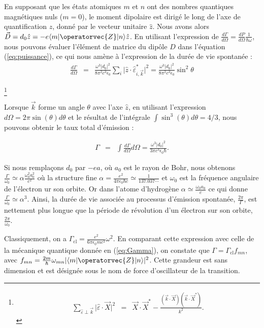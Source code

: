 En supposant que les états atomiques $m$ et $n$ ont des nombres quantiques magnétiques nuls ($m=0$), le moment dipolaire est dirigé le long de l'axe de quantification $z$, donné par le vecteur unitaire $\hat{z}$. Nous avons alors $\vec{D} = d_0\hat{z} = -e\langle m | \operatorvec{Z} | n \rangle \hat{z}$. En utilisant l'expression de $\frac{d\Gamma}{d\Omega} = \frac{dP}{d\Omega}\frac{1}{\hbar \omega }$, nous pouvons évaluer l'élément de matrice du dipôle $D$ dans l'équation (\ref{eq:puissance}), ce qui nous amène à l'expression de la durée de vie spontanée :
\begin{eqnarray}
	\frac{ d \Gamma}{d \Omega} & = & \frac{\omega^3 \vert d_0 \vert ^2}{8 \pi^2 c^3 \epsilon_0} \sum_i \vert \hat{z} \cdot \hat{\varepsilon}_{i , \vec{k}}^\ast \vert^2  = \frac{\omega^3 \vert d_0 \vert ^2}{8 \pi^2 c^3 \epsilon_0} \sin^2 \theta 
\end{eqnarray}

\footnote{
\begin{eqnarray}
	\sum_{\hat{\varepsilon} \perp \vec{k}} \vert \hat{\varepsilon} \cdot \vec{X} \vert^2 & = & \vec{X} \cdot \vec{X}^\ast - \frac{(\vec{k} \cdot \vec{X})(\vec{k} \cdot \vec{X}^\ast)}{k^2}.
\end{eqnarray}
}

Lorsque $\vec{k}$ forme un angle $\theta$ avec l'axe $\hat{z}$, en utilisant l'expression $d\Omega = 2\pi\sin(\theta)d\theta$ et le résultat de l'intégrale $\int  \sin^3(\theta)d\theta = 4/3$, nous pouvons obtenir le taux total d'émission :

\begin{eqnarray}
	\Gamma  & =  & \int \frac{d\Gamma}{d \Omega}  d \Omega =  \frac{\omega^3 |d_0|^2}{3\pi c^3 \epsilon_0 \hbar}. \label{eq:Gamma}	
\end{eqnarray}


Si nous remplaçons $d_0$ par $-ea$, où $a_0$ est le rayon de Bohr, nous obtenons $\frac{\Gamma}{\omega_0 } \simeq \alpha \frac{ \omega_0^2 a_0^2}{c^2}$ où la structure fine $\alpha = \frac{e^2}{4 \pi \epsilon_0 \hbar c} \simeq \frac{1}{137.037\cdots}$ et $\omega_0$ est la fréquence angulaire de l'électron ur son orbite. Or dans l'atome d'hydrogène $\alpha \simeq \frac{\omega_0 a_0}{c}$ ce qui donne $\frac{\Gamma}{\omega_0} \simeq \alpha^3$. Ainsi, la durée de vie associée au processus d'émission spontanée, $\frac{2\pi}{\Gamma}$, est nettement plus longue que la période de révolution d'un électron sur son orbite, $\frac{2\pi}{\omega_0}$.
 

Classiquement, on a $\Gamma_{\text{cl}} = \frac{e^2 }{6 \pi \epsilon_0 m c^3}\omega^2 $. En comparant cette expression avec celle de la mécanique quantique donnée en (\ref{eq:Gamma}), on constate que $\Gamma = \Gamma_{\text{cl}} f_{mn}$, avec $f_{mn} = \frac{2m}{\hbar} \omega_{mn} \vert \langle m|\operatorvec{Z} |n \rangle \vert^2$. Cette grandeur est sans dimension et est désignée sous le nom de force d'oscillateur de la transition.